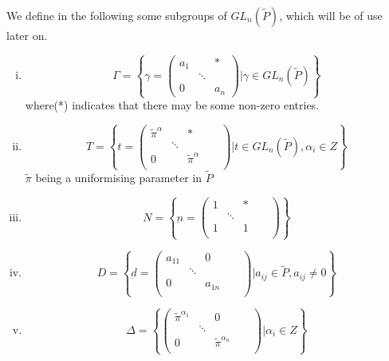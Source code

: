 We define in the following some subgroups of $G L_n(\widetilde{P})$,
which will be of use later on. 
\begin{enumerate}[(i)]
\item
  \begin{equation*}
    \Gamma = \left \{ \gamma = 
    \begin{pmatrix}
      a_1 & & *\\
      & \ddots &\\
      0 & & a_n
    \end{pmatrix} 
    | \gamma \in G L_n (\widetilde{P})
    \right \}
  \end{equation*}
  where(*) indicates that there may be some non-zero entries.
\item 
  \begin{equation*}
    T = \left \{ t = 
    \begin{pmatrix}
      \widetilde{\pi}^{\alpha}& & *\\
      & \ddots &\\
      0 & & \widetilde{\pi}^{\alpha}& & \\
    \end{pmatrix} 
    | t \in G L_n (\widetilde{P}), \alpha_i \in Z
    \right \}
  \end{equation*}\pageoriginale
 $\widetilde{\pi}$ being a uniformising parameter in $\tilde{P}$
\item  
  \begin{equation*}
    N = \left \{ \underbar{n} = 
    \begin{pmatrix}
      1& & *\\
      & \ddots &\\
      1 & & 1& & \\
    \end{pmatrix} 
    \right \}
  \end{equation*}
\item
  \begin{equation*}
    D = \left \{ \underbar{d} = 
    \begin{pmatrix}
      a_{11}& & 0\\
      & \ddots &\\
      0 & & a_{1 n}& & \\
    \end{pmatrix} 
    \Bigg | a_{ij} \in \widetilde{P}, a_{i j} \neq 0
    \right \}
  \end{equation*}
\item
  \begin{equation*}
    \Delta= \left \{  
    \begin{pmatrix}
      \widetilde{\pi}^{\alpha_1}& & 0\\
      & \ddots &\\
      0 & & \widetilde{\pi}^{\alpha_n}& & \\
    \end{pmatrix} 
    \Bigg | \alpha_i \in Z
    \right \}
  \end{equation*}
\end{enumerate}

